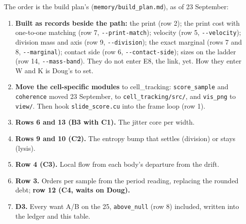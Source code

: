 The order is the build plan's (\texttt{memory/\allowbreak{}build\_\allowbreak{}plan.\allowbreak{}md}), as of 23 September:

\begin{enumerate}
\item \textbf{Built as records beside the path:} the print (row 2); the print cost with one-to-one matching (row 7, \texttt{-\allowbreak{}-\allowbreak{}print-\allowbreak{}match}); velocity (row 5, \texttt{-\allowbreak{}-\allowbreak{}velocity}); division mass and axis (row 9, \texttt{-\allowbreak{}-\allowbreak{}division}); the exact marginal (rows 7 and 8, \texttt{-\allowbreak{}-\allowbreak{}marginal}); contact side (row 6, \texttt{-\allowbreak{}-\allowbreak{}contact-\allowbreak{}side}); sizes on the ladder (row 14, \texttt{-\allowbreak{}-\allowbreak{}mass-\allowbreak{}band}). They do not enter E8, the link, yet. How they enter W and K is Doug's to set.
\item \textbf{Move the cell-specific modules} to cell\_\allowbreak{}tracking: \texttt{score\_\allowbreak{}sample} and \texttt{coherence} moved 23 September, to \texttt{cell\_\allowbreak{}tracking/\allowbreak{}src/\allowbreak{}}, and \texttt{vis\_\allowbreak{}png} to \texttt{view/\allowbreak{}}. Then hook \texttt{slide\_\allowbreak{}score.\allowbreak{}cu} into the frame loop (row 1).
\item \textbf{Rows 6 and 13 (B3 with C1).} The jitter core per width.
\item \textbf{Rows 9 and 10 (C2).} The entropy bump that settles (division) or stays (lysis).
\item \textbf{Row 4 (C3).} Local flow from each body's departure from the drift.
\item \textbf{Row 3.} Orders per sample from the period reading, replacing the rounded debt; \textbf{row 12 (C4, waits on Doug).}
\item \textbf{D3.} Every want A/B on the 25, \texttt{above\_\allowbreak{}null} (row 8) included, written into the ledger and this table.
\end{enumerate}
